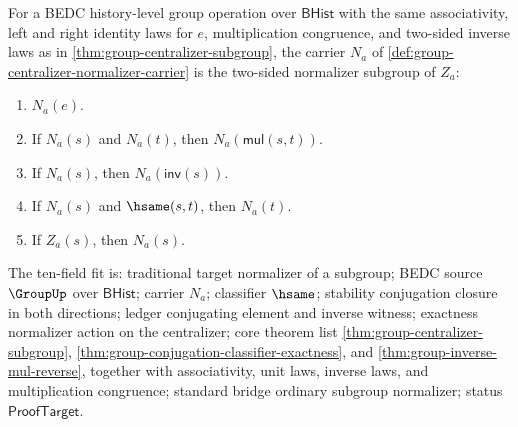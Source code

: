 \begin{theorem}
\label{thm:group-centralizer-normalizer-subgroup}
For a BEDC history-level group operation over $\mathsf{BHist}$ with the same
associativity, left and right identity laws for $e$, multiplication
congruence, and two-sided inverse laws as in
\autoref{thm:group-centralizer-subgroup}, the carrier $N_a$ of
\autoref{def:group-centralizer-normalizer-carrier} is the two-sided
normalizer subgroup of $Z_a$:
\begin{enumerate}
\item $N_a(e)$.
\item If $N_a(s)$ and $N_a(t)$, then $N_a(\mathsf{mul}(s,t))$.
\item If $N_a(s)$, then $N_a(\mathsf{inv}(s))$.
\item If $N_a(s)$ and $\hsame(s,t)$, then $N_a(t)$.
\item If $Z_a(s)$, then $N_a(s)$.
\end{enumerate}
The ten-field fit is: traditional target normalizer of a subgroup; BEDC source
$\GroupUp$ over $\mathsf{BHist}$; carrier $N_a$; classifier $\hsame$;
stability conjugation closure in both directions; ledger conjugating element
and inverse witness; exactness normalizer action on the centralizer; core
theorem list \autoref{thm:group-centralizer-subgroup},
\autoref{thm:group-conjugation-classifier-exactness}, and
\autoref{thm:group-inverse-mul-reverse}, together with associativity, unit
laws, inverse laws, and multiplication congruence; standard bridge ordinary
subgroup normalizer; status $\mathsf{ProofTarget}$.
\end{theorem}
